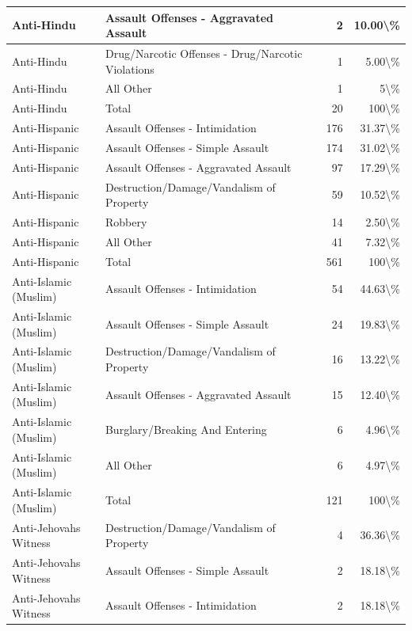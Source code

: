 \documentclass[
]{krantz}
\begin{document}
\begin{longtable}[t]{l|l|r|r}
Anti-Hindu & Assault Offenses - Aggravated Assault & 2 & 10.00\textbackslash{}\%\\
\hline
Anti-Hindu & Drug/Narcotic Offenses - Drug/Narcotic Violations & 1 & 5.00\textbackslash{}\%\\
\hline
Anti-Hindu & All Other & 1 & 5\textbackslash{}\%\\
\hline
Anti-Hindu & Total & 20 & 100\textbackslash{}\%\\
\hline
Anti-Hispanic & Assault Offenses - Intimidation & 176 & 31.37\textbackslash{}\%\\
\hline
Anti-Hispanic & Assault Offenses - Simple Assault & 174 & 31.02\textbackslash{}\%\\
\hline
Anti-Hispanic & Assault Offenses - Aggravated Assault & 97 & 17.29\textbackslash{}\%\\
\hline
Anti-Hispanic & Destruction/Damage/Vandalism of Property & 59 & 10.52\textbackslash{}\%\\
\hline
Anti-Hispanic & Robbery & 14 & 2.50\textbackslash{}\%\\
\hline
Anti-Hispanic & All Other & 41 & 7.32\textbackslash{}\%\\
\hline
Anti-Hispanic & Total & 561 & 100\textbackslash{}\%\\
\hline
Anti-Islamic (Muslim) & Assault Offenses - Intimidation & 54 & 44.63\textbackslash{}\%\\
\hline
Anti-Islamic (Muslim) & Assault Offenses - Simple Assault & 24 & 19.83\textbackslash{}\%\\
\hline
Anti-Islamic (Muslim) & Destruction/Damage/Vandalism of Property & 16 & 13.22\textbackslash{}\%\\
\hline
Anti-Islamic (Muslim) & Assault Offenses - Aggravated Assault & 15 & 12.40\textbackslash{}\%\\
\hline
Anti-Islamic (Muslim) & Burglary/Breaking And Entering & 6 & 4.96\textbackslash{}\%\\
\hline
Anti-Islamic (Muslim) & All Other & 6 & 4.97\textbackslash{}\%\\
\hline
Anti-Islamic (Muslim) & Total & 121 & 100\textbackslash{}\%\\
\hline
Anti-Jehovahs Witness & Destruction/Damage/Vandalism of Property & 4 & 36.36\textbackslash{}\%\\
\hline
Anti-Jehovahs Witness & Assault Offenses - Simple Assault & 2 & 18.18\textbackslash{}\%\\
\hline
Anti-Jehovahs Witness & Assault Offenses - Intimidation & 2 & 18.18\textbackslash{}\%\\

\end{longtable}
\end{document}
